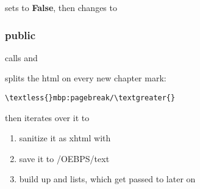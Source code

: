 \documentclass[letterpaper,10pt,english]{sphinxmanual}
\begin{document}

\begin{fulllineitems}
\label{epub:mobi2epub::set_out__ssR}
sets {\hyperref[epub:vanilla_out__mutable-b]{}} to \textbf{False}, then
changes {\hyperref[epub:path_tmp__boost::filesystem::path]{}} to

\end{fulllineitems}



\subsubsection{public}
\label{epub:public}

\begin{fulllineitems}
\label{epub:mobi2epub::mobi2epub__mobi::mobireaderCR.b.b}
\end{fulllineitems}


\begin{fulllineitems}
\label{epub:mobi2epub::save_to_directoryC}
calls {\hyperref[epub:mobi2epub::directory_structureC]{}} and {\hyperref[mobireader:mobireader::get_htmlC]{}}

splits the html on every new chapter mark:

\begin{Verbatim}[commandchars=\\\{\}]
\textless{}mbp:pagebreak/\textgreater{}
\end{Verbatim}

then iterates over it to
\begin{enumerate}
\item {} 
sanitize it as xhtml with 

\item {} 
save it to {\hyperref[epub:path_tmp__boost::filesystem::path]{}} /OEBPS/text

\item {} 
build up {\hyperref[epub:itemid__ss]{}} and {\hyperref[epub:itemref__ss]{}} lists, which get passed to {\hyperref[epub:mobi2epub::gen_content_opf__std::stringstreamR.std::stringstreamRC]{}} later on

\end{enumerate}

\end{fulllineitems}
\end{document}
